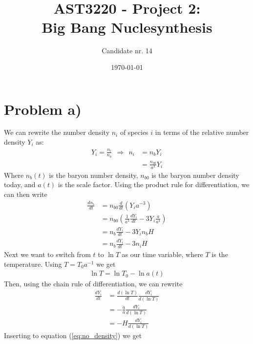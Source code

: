 \documentclass[reprint,english,notitlepage]{revtex4-1}  %
\numberwithin{equation}{section}
\begin{document}
\title{AST3220 - Project 2: \\ Big Bang Nuclesynthesis}   %
\author{Candidate nr. 14}
\date{\today}                             %
\noaffiliation                            %
\maketitle                                %

\section{Problem a)}
 We can rewrite the number density $n_i$ of species $i$ in terms of the relative number
 density $Y_i$ as:
\begin{align}
	Y_i = \frac{n_i}{n_b} \ \ \Rightarrow \ \ n_i &= n_b Y_i \label{eq:rel_no_density} \\
																						&= \frac{n_{b0}}{a^3}Y_i
\end{align}
Where $n_b(t)$ is the baryon number density, $n_{b0}$ is the baryon number
density today, and $a(t)$ is the scale factor. Using the product rule for
differentiation, we can then write
\begin{align}
	\frac{d n_i}{dt} &= n_{b0}\frac{d}{dt}\left(Y_i a^{-3}\right) \\
									 &= n_{b0}\left(\frac{1}{a^3}\frac{dY_i}{dt} - 3Y_i\frac{\dot{a}}{a^4}\right) \\
									 &= n_b \frac{dY_i}{dt} - 3 Y_i n_b H \label{eq:no_density} \\
									 &= n_b \frac{dY_i}{dt} - 3 n_i H \label{eq:no_density}
\end{align}
Next we want to switch from $t$ to $\ln T$ as our time variable, where
$T$ is the temperature. Using $T=T_0 a^{-1}$ we get
\begin{align}
	\ln T = \ln T_0 - \ln a(t)
\end{align}
Then, using the chain rule of differentiation, we can rewrite
\begin{align}
	\frac{dY_i}{dt} &= \frac{d(\ln T)}{dt} \frac{dY_i}{d(\ln T)} \\
									&= -\frac{\dot{a}}{a} \frac{dY_i}{d(\ln T)} \\
									&= -H \frac{dY_i}{d(\ln T)}
\end{align}
Inserting to equation (\ref{eq:no_density}) we get
\end{document}
